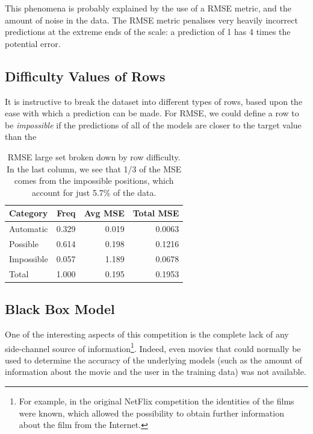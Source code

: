 \documentclass{article}
\begin{document}
This phenomena is probably explained by the use of a RMSE metric, and the amount of noise in the data.  The RMSE metric penalises very heavily incorrect predictions at the extreme ends of the scale: a prediction of 1 has 4 times the potential error.

\subsection{Difficulty Values of Rows}

It is instructive to break the dataset into different types of rows, based upon the ease with which a prediction can be made.  For RMSE, we could define a row to be \emph{impossible} if the predictions of all of the models are closer to the target value than the

\begin{table}[t]
\caption{RMSE large set broken down by row difficulty.  In the last column, we see that 1/3 of the MSE comes from the impossible positions, which account for just 5.7\% of the data.}
\label{rowtypesrmse}
\vskip 0.15in
\begin{center}
\begin{small}
\begin{sc}
\begin{tabular}{lrrr}
\hline
\abovespace\belowspace
Category & Freq & Avg MSE & Total MSE \\
\hline
\abovespace
Automatic     & 0.329 & 0.019 & 0.0063 \\
Possible      & 0.614 & 0.198 & 0.1216 \\
\belowspace
Impossible    & 0.057 & 1.189 & 0.0678 \\
\hline
Total         & 1.000 & 0.195 & 0.1953 \\
\hline
\end{tabular}
\end{sc}
\end{small}
\end{center}
\vskip -0.1in
\end{table}




\subsection{Black Box Model}



One of the interesting aspects of this competition is the complete lack of any
side-channel source of information\footnote{For example, in the original NetFlix
competition the identities of the films were known, which allowed the
possibility to obtain further information about the film from the Internet.}.  Indeed, even movies that could normally be used to determine the accuracy of the underlying models (such as the amount of information about the movie and the user in the training data) was not available.
\end{document}
